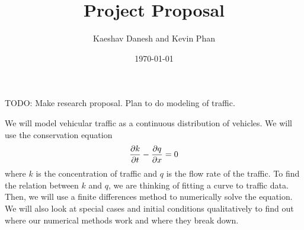\documentclass[12pt]{article}
\title{Project Proposal}
\author{Kaeshav Danesh and Kevin Phan}
\date{\today}
\begin{document}
	
	\maketitle
    TODO: Make research proposal. Plan to do modeling of traffic. 

    We will model vehicular traffic as a continuous distribution of vehicles. We will use the conservation equation 
    \begin{equation}
        \pdv{k}{t} - \pdv{q}{x} = 0
    \end{equation}
    where $k$ is the concentration of traffic and $q$ is the flow rate of the traffic. To find the relation between $k$ and $q$, we are thinking of fitting a curve to traffic data. Then, we will use a finite differences method to numerically solve the equation. We will also look at special cases and initial conditions qualitatively to find out where our numerical methods work and where they break down. 
\end{document}
